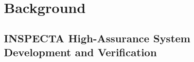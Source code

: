 \documentclass[conference]{IEEEtran}
\begin{document}



\section{Background}
\label{sec:background}

\subsection{INSPECTA High-Assurance System Development and Verification}
\label{sec:gumbo}
\end{document}
